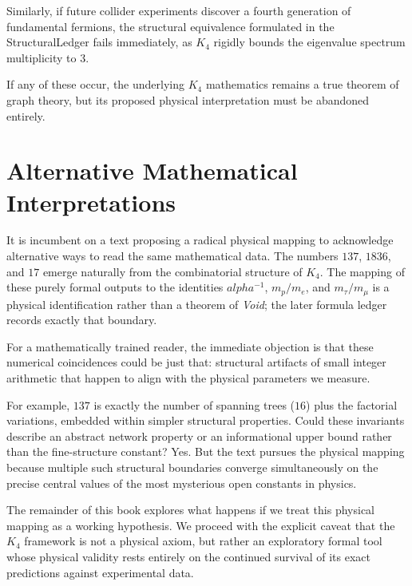 \documentclass[11pt,a4paper]{book}
\def\alpha{alpha}%
\def\texttt#1{#1}%
\begin{document}
Similarly, if future collider experiments discover a fourth generation of fundamental fermions, the structural equivalence formulated in the \texttt{StructuralLedger} fails immediately, as $K_4$ rigidly bounds the eigenvalue spectrum multiplicity to 3.

If any of these occur, the underlying $K_4$ mathematics remains a true theorem of graph theory, but its proposed physical interpretation must be abandoned entirely.

\chapter{Alternative Mathematical Interpretations}
\label{ch:alternatives}

It is incumbent on a text proposing a radical physical mapping to acknowledge alternative ways to read the same mathematical data. The numbers $137$, $1836$, and $17$ emerge naturally from the combinatorial structure of $K_4$. The mapping of these purely formal outputs to the identities $\alpha^{-1}$, $m_p/m_e$, and $m_\tau/m_\mu$ is a physical identification rather than a theorem of \textit{Void}; the later formula ledger records exactly that boundary.

For a mathematically trained reader, the immediate objection is that these numerical coincidences could be just that: structural artifacts of small integer arithmetic that happen to align with the physical parameters we measure. 

For example, $137$ is exactly the number of spanning trees ($16$) plus the factorial variations, embedded within simpler structural properties. Could these invariants describe an abstract network property or an informational upper bound rather than the fine-structure constant? Yes. But the text pursues the physical mapping because multiple such structural boundaries converge simultaneously on the precise central values of the most mysterious open constants in physics. 

The remainder of this book explores what happens if we treat this physical mapping as a working hypothesis. We proceed with the explicit caveat that the $K_4$ framework is not a physical axiom, but rather an exploratory formal tool whose physical validity rests entirely on the continued survival of its exact predictions against experimental data.
\end{document}
